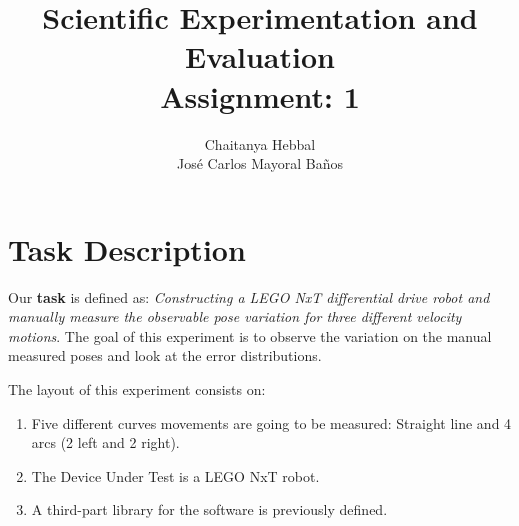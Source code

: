 \documentclass[10pt]{scrartcl}
\title{Scientific Experimentation and Evaluation\\
	   \small{Assignment: 1}}
\author{Chaitanya Hebbal\\
		Jos\'e Carlos Mayoral Ba\~nos}
\begin{document}
	\maketitle
\section*{Task Description}

Our \textbf{task} is defined as: \textit{Constructing a LEGO NxT differential drive robot and manually measure the observable pose variation for three different velocity motions}. The goal of this experiment is to observe the variation on the manual measured poses and look at the error distributions.



The layout of this experiment consists on:
\begin{enumerate}
	\item Five different curves movements are going to be measured: Straight line and 4 arcs (2 left and 2 right).
	\item The Device Under Test is a LEGO NxT robot.
	\item A third-part library for the software is previously defined.
\end{enumerate}
\end{document}
